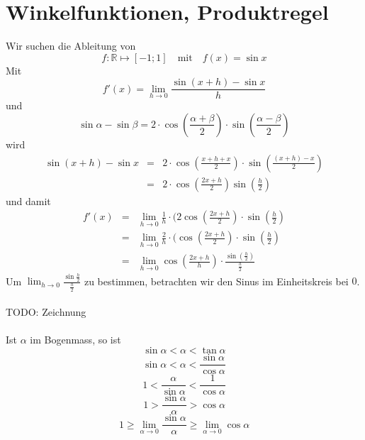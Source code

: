 \documentclass{report}
\begin{document}
\section{Winkelfunktionen, Produktregel}
Wir suchen die Ableitung von
\begin{equation}f: \mathbb{R} \mapsto [-1 ; 1] \quad \mbox{mit} \quad f(x) = \sin x\end{equation}
Mit
\begin{equation}f'(x) = \lim_{h \to 0}\frac{\sin(x+h) - \sin x}{h}\end{equation}
und
\begin{equation}\sin \alpha - \sin \beta = 2 \cdot \cos(\frac{\alpha + \beta}{2}) \cdot \sin(\frac{\alpha - \beta}{2})\end{equation}
wird
\begin{eqnarray}\sin(x+h) - \sin x & = & 2 \cdot \cos(\frac{x+h+x}{2}) \cdot \sin(\frac{(x+h)-x}{2}) \nonumber \\
& = & 2 \cdot \cos(\frac{2x + h}{2}) \sin(\frac{h}{2})\end{eqnarray}
und damit
\begin{eqnarray}f'(x) & = & \lim_{h \to 0} \frac{1}{h} \cdot (2\cos(\frac{2x+h}{2}) \cdot \sin(\frac{h}{2}) \nonumber \\
& = & \lim_{h \to 0} \frac{2}{h} \cdot (\cos(\frac{2x+h}{2}) \cdot \sin(\frac{h}{2}) \nonumber \\
& = & \lim_{h \to 0} \cos(\frac{2x + h}{h}) \cdot \frac{\sin(\frac{h}{2})}{\frac{h}{2}}\end{eqnarray}
Um $\lim_{h \to 0} \frac{\sin \frac{h}{2}}{\frac{h}{2}}$ zu bestimmen, betrachten wir den Sinus im Einheitskreis bei $0$.
\\\\TODO: Zeichnung\\\\
Ist $\alpha$ im Bogenmass, so ist
\begin{equation}\sin \alpha < \alpha < \tan \alpha\end{equation}
\begin{equation}\sin \alpha < \alpha < \frac{\sin \alpha}{\cos \alpha}\end{equation}
\begin{equation}1 < \frac{\alpha}{\sin \alpha} < \frac{1}{\cos \alpha}\end{equation}
\begin{equation}1 > \frac{\sin \alpha}{\alpha} > \cos \alpha\end{equation}
\begin{equation}1 \geq \lim_{\alpha \to 0} \frac{\sin \alpha}{\alpha} \geq \lim_{\alpha \to 0} \cos \alpha\end{equation}
\end{document}

